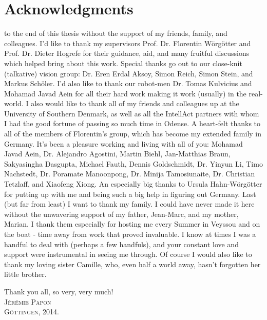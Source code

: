 \chapter*{Acknowledgments}
\vspace{40mm}
 to the end of this thesis without the support of my friends, family, and colleagues. I'd like to thank my supervisors Prof. Dr. Florentin W\"org\"otter and Prof. Dr. Dieter Hogrefe for their guidance, aid, and many fruitful discussions which helped bring about this work. Special thanks go out to our close-knit (talkative) vision group: Dr. Eren Erdal Aksoy, Simon Reich, Simon Stein, and Markus Sch\"oler. I'd also like to thank our robot-men Dr. Tomas Kulvicius and Mohamad Javad Aein for all their hard work making it work (usually) in the real-world. I also would like to thank all of my friends and colleagues up at the University of Southern Denmark, as well as all the IntellAct partners with whom I had the good fortune of passing so much time in Odense. 
\vspace{20pt}
A heart-felt thanks to all of the members of Florentin's group, which has become my extended family in Germany. It's been a pleasure working and living with all of you: Mohamad Javad Aein, Dr. Alejandro Agostini, Martin Biehl, Jan-Matthias Braun, Sakyasingha Dasgupta, Michael Fauth, Dennis Goldschmidt, Dr. Yinyun Li, Timo Nachstedt, Dr. Poramate Manoonpong, Dr. Minija Tamosiunaite, Dr. Christian Tetzlaff, and Xiaofeng Xiong. An especially big thanks to Ursula Hahn-W\"org\"otter for putting up with me and being such a big help in figuring out Germany.
\vspace{20pt}
Last (but far from least) I want to thank my family. I could have never made it here without the unwavering support of my father, Jean-Marc, and my mother, Marian. I thank them especially for hosting me every Summer in Veyssou and on the boat - time away from work that proved invaluable. I know at times I was a handful to deal with (perhaps a few handfuls), and your constant love and support were instrumental in seeing me through. Of course I would also like to thank my loving sister Camille, who, even half a world away, hasn't forgotten her little brother.
\begin{flushright}
\vspace{20pt}
Thank you all, so very, very much! \\
\vspace{20pt}
\textsc{J\'er\'emie Papon} \\
\textsc{G\"ottingen, 2014.}
\end{flushright}

